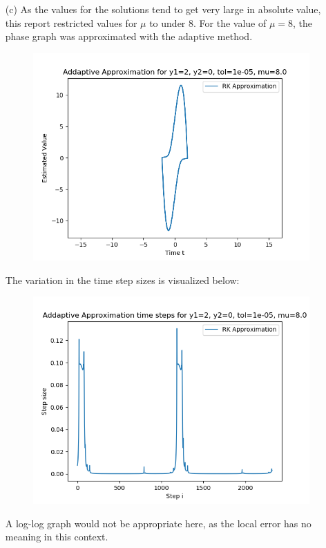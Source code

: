 \documentclass{article}
\begin{document}
\begin{itemize}
	\item[(c)]
		As the values for the solutions tend to get very large in
		absolute value, this report restricted values for $\mu$ to under
		$8$. For the value of $\mu=8$, the phase graph was approximated
		with the adaptive method.
		\begin{figure}[H]
			\includegraphics[scale=0.6]{adapt_vdp8}
		\end{figure}
		The variation in the time step sizes is visualized below:
		\begin{figure}[H]
			\includegraphics[scale=0.6]{adapt_times}
		\end{figure}

		A log-log graph would not be appropriate here, as the local
		error has no meaning in this context.
\end{itemize}
\end{document}
